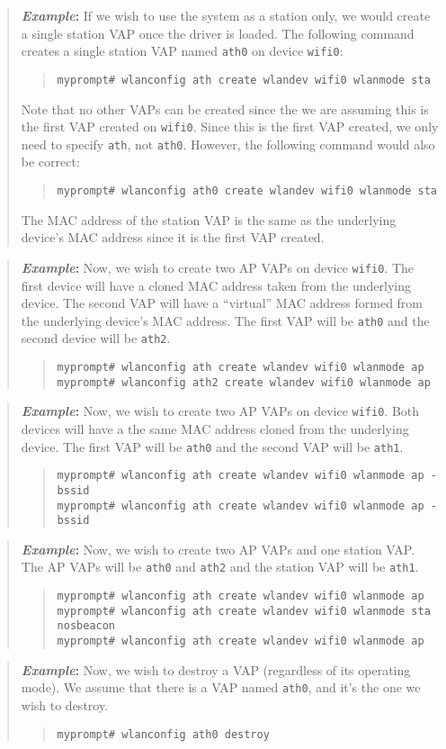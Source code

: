 \documentclass[10pt,fullpage]{article}
\newcommand{\mytt}[1]{{\texttt{#1}}}
\newcommand{\bv}{\begin{verse}}
\newcommand{\ev}{\end{verse}}
\newcommand{\cmd}[1]{{\texttt{myprompt\# #1}}}
\newenvironment{example}{\begin{quote}\textbf{\textit{Example}:}}{\end{quote}}
\begin{document}
\begin{example}
  If we wish to use the system as a station only, we would create a
  single station VAP once the driver is loaded.  The following
  command creates a single station VAP named \mytt{ath0} on device
  \mytt{wifi0}:
  \bv
  \cmd{wlanconfig ath create wlandev wifi0 wlanmode sta}
  \ev
  Note that no other VAPs can be created since the we are assuming
  this is the first VAP created on \mytt{wifi0}.  Since this is the
  first VAP created, we only need to specify \mytt{ath}, not
  \mytt{ath0}.  However, the following command would also be correct:
  \bv
  \cmd{wlanconfig ath0 create wlandev wifi0 wlanmode sta}
  \ev
  The MAC address of the station VAP is the same as the underlying
  device's MAC address since it is the first VAP created.
\end{example}
\begin{example}
  Now, we wish to create two AP VAPs on device \mytt{wifi0}.  The first
  device will have a cloned MAC address taken from the underlying
  device. The second VAP will have a ``virtual'' MAC address formed
  from the underlying device's MAC address.  The first VAP will be
  \mytt{ath0} and the second device will be \mytt{ath2}.
  \bv
  \cmd{wlanconfig ath create wlandev wifi0 wlanmode ap}\\
  \cmd{wlanconfig ath2 create wlandev wifi0 wlanmode ap}
  \ev
\end{example}
\begin{example}
  Now, we wish to create two AP VAPs on device \mytt{wifi0}.  Both
  devices will have a the same MAC address cloned from the underlying
  device.  The first VAP will be \mytt{ath0} and the second VAP will
  be \mytt{ath1}.
  \bv
  \cmd{wlanconfig ath create wlandev wifi0 wlanmode ap -bssid}\\
  \cmd{wlanconfig ath create wlandev wifi0 wlanmode ap -bssid}
  \ev
\end{example}
\begin{example}
  Now, we wish to create two AP VAPs and one station VAP.  The AP VAPs
  will be \mytt{ath0} and \mytt{ath2} and the station VAP will be
  \mytt{ath1}.
  \bv
  \cmd{wlanconfig ath create wlandev wifi0 wlanmode ap}\\
  \cmd{wlanconfig ath create wlandev wifi0 wlanmode sta nosbeacon}\\
  \cmd{wlanconfig ath create wlandev wifi0 wlanmode ap}
  \ev
\end{example}
\begin{example}
  Now, we wish to destroy a VAP (regardless of its operating mode).
  We assume that there is a VAP named \mytt{ath0}, and it's the one
  we wish to destroy.
  \bv
  \cmd{wlanconfig ath0 destroy}
  \ev
\end{example}
\end{document}

